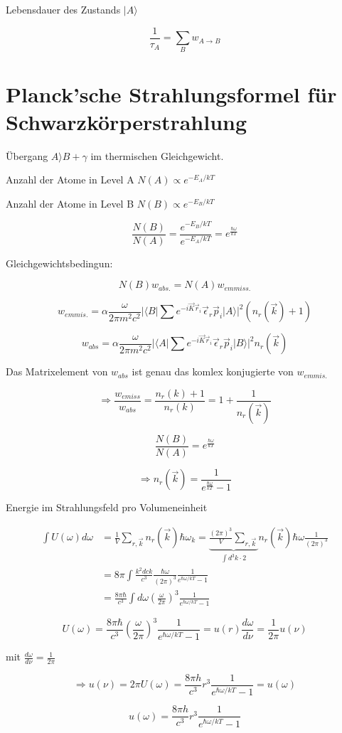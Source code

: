 Lebensdauer des Zustands \(|A\rangle \)

\[\boxed{\frac{1}{\tau_A} = \sum_B w_{A\to B}}\]


\section{Planck'sche Strahlungsformel für Schwarzkörperstrahlung}


Übergang \(A\rangle B+\gamma\) im thermischen Gleichgewicht. 

Anzahl der Atome in Level A \(N(A)\propto e^{-E_A/kT}\)

Anzahl der Atome in Level B \(N(B)\propto e^{-E_B/kT}\)

\[\frac{N(B)}{N(A)} = \frac{e^{-E_B/kT}}{e^{-E_A/kT}} = e^{\frac{\hbar \omega}{kT}}\]

Gleichgewichtsbedingun:

\[N(B) w_{abs.} = N(A)w_{emmiss.}\]


\[w_{emmis.} = \alpha \frac{\omega}{2\pi m^2c^2}|\langle B|\sum e^{-i\vec K\vec r_i}\vec \epsilon_r\vec p_i|A\rangle |^2(n_r(\vec k)+1)\]

\[w_{abs} = \alpha \frac{\omega}{2\pi m^2c^2}|\langle A|\sum e^{-i\vec K\vec r_i}\vec \epsilon_r\vec p_i|B\rangle |^2n_r(\vec k)\]

Das Matrixelement von \(w_{abs}\) ist genau das komlex konjugierte von \(w_{emmis.}\)

\[\Rightarrow \frac{w_{emiss}}{w_{abs}} = \frac{n_r(k)+1}{n_r(k)} = 1+\frac{1}{n_r(\vec k)}\]

\[\frac{N(B)}{N(A)} = e^{\frac{\hbar\omega}{kT}}\]


\[\Rightarrow \boxed{n_r(\vec k) = \frac{1}{e^{\frac{\hbar\omega}{kT}}-1} } \]


Energie im Strahlungsfeld pro Volumeneinheit

\begin{align}
\int U(\omega)d\omega &= \frac{1}{V} \sum_{r,\vec k}n_r(\vec k) \hbar \omega_k = \underbrace{\frac{(2\pi)^3}{V}\sum_{r,\vec k}}_{\int d^3 k\cdot 2}  n_r(\vec k)\hbar\omega \frac{1}{(2\pi)^3}\\
&=8\pi \int \frac{k^2 dck}{c^3}\frac{\hbar\omega}{(2\pi)^3}\frac{1}{e^{\hbar\omega/kT}-1}\\
&= \frac{8\pi\hbar}{c^3}\int d\omega (\frac{\omega}{2\pi})^3 \frac{1}{e^{\hbar\omega/kT}-1}
\end{align}


\[U(\omega) = \frac{8\pi\hbar}{c^3} (\frac{\omega}{2\pi})^3 \frac{1}{e^{\hbar\omega/kT}-1} = u(r) \frac{d\omega}{d\nu} = \frac{1}{2\pi}u(\nu) \]

mit \(\frac{d\omega}{d\nu} = \frac{1}{2\pi}\)

\[\Rightarrow u(\nu) = 2\pi U(\omega) = \frac{8\pi h}{c^3} r^3 \frac{1}{e^{\hbar\omega/kT}-1} = u(\omega) \]

\[\boxed{ u(\omega)= \frac{8\pi h}{c^3} r^3 \frac{1}{e^{\hbar\omega/kT}-1}  }  \]





